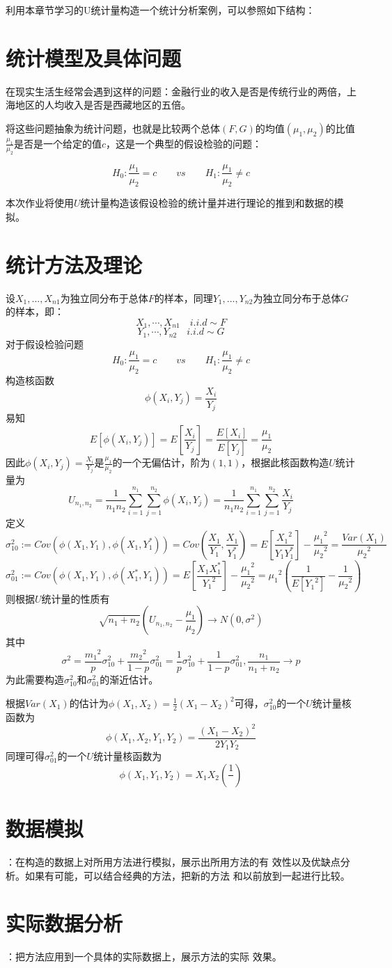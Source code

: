 \documentclass[UTF8]{article}
\begin{document}
	利用本章节学习的U统计量构造一个统计分析案例，可以参照如下结构：
	\section{统计模型及具体问题}
	在现实生活生经常会遇到这样的问题：金融行业的收入是否是传统行业的两倍，上海地区的人均收入是否是西藏地区的五倍。
	
	将这些问题抽象为统计问题，也就是比较两个总体$(F,G)$的均值$(\mu_1,\mu_2)$的比值$\frac{\mu_1}{\mu_2}$是否是一个给定的值$c$，这是一个典型的假设检验的问题：
	
	$$H_0:\frac{\mu_1}{\mu_2}=c \qquad vs\qquad H_1:\frac{\mu_1}{\mu_2}\neq c$$
	
	本次作业将使用$U$统计量构造该假设检验的统计量并进行理论的推到和数据的模拟。
	\section{统计方法及理论}
	设$X_1,...,X_{n1}$为独立同分布于总体$F$的样本，同理$Y_1,...,Y_{n2}$为独立同分布于总体$G$的样本，即：
	$$X_1,\cdots,X_{n1}\quad i.i.d \sim F$$
	$$Y_1,\cdots,Y_{n2}\quad i.i.d \sim G$$
	对于假设检验问题
	$$H_0:\frac{\mu_1}{\mu_2}=c \qquad vs\qquad H_1:\frac{\mu_1}{\mu_2}\neq c$$
	构造核函数
	$$\phi(X_i, Y_j)=\frac{X_i}{Y_j}$$
	易知
	$$E[\phi(X_i, Y_j)]=E[\frac{X_i}{Y_j}]=\frac{E[X_i]}{E[Y_j]}=\frac{\mu_1}{\mu_2}$$
	因此$\phi(X_i, Y_j)=\frac{X_i}{Y_j}$是$\frac{\mu_1}{\mu_2}$的一个无偏估计，阶为$(1, 1)$，根据此核函数构造$U$统计量为
		$$U_{n_1,n_2}=\frac{1}{n_1n_2}\sum_{i=1}^{n_1}\sum_{j=1}^{n_2}\phi(X_i, Y_j)=\frac{1}{n_1n_2}\sum_{i=1}^{n_1}\sum_{j=1}^{n_2}\frac{X_i}{Y_j}$$
	定义
	$$\sigma^2_{10} := Cov(\phi(X_1,Y_1),\phi(X_1,Y^*_1))=Cov(\frac{X_1}{Y_1},\frac{X_1}{Y^*_1})
	=E[\frac{{X_1}^2}{Y_1Y^*_1}]-\frac{{\mu_1}^2}{{\mu_2}^2}=\frac{Var(X_1)}{{\mu_2}^2}$$
	$$\sigma^2_{01} := Cov(\phi(X_1,Y_1),\phi(X^*_1,Y_1))=E[\frac{X_1X^*_1}{{Y_1}^2}]-\frac{{\mu_1}^2}{{\mu_2}^2}
	={\mu_1}^2(\frac1{E[{Y_1}^2]}-\frac1{{\mu_2}^2})$$
	则根据$U$统计量的性质有
	$$\sqrt{n_1+n_2}(U_{n_1,n_2}-\frac{\mu_1}{\mu_2})\rightarrow N(0,\sigma^2)$$
	其中
	$$\sigma^2=\frac{{m_1}^2}{p}\sigma^2_{10}+\frac{{m_2}^2}{1-p}\sigma^2_{01}
	=\frac1{p}\sigma^2_{10}+\frac1{1-p}\sigma^2_{01}, \frac{n_1}{n_1+n_2}\rightarrow p$$
	为此需要构造$\sigma^2_{10}$和$\sigma^2_{01}$的渐近估计。
	
	根据$Var(X_1)$的估计为$\phi(X_1, X_2)=\frac1{2}(X_1-X_2)^2$可得，$\sigma^2_{10}$的一个$U$统计量核函数为
	$$\phi(X_1, X_2,Y_1,Y_2) = \frac{(X_1-X_2)^2}{2Y_1Y_2}$$
	同理可得$\sigma^2_{01}$的一个$U$统计量核函数为
	$$\phi(X_1,Y_1,Y_2) = X_1X_2(\frac1{})$$
	\section{数据模拟}：在构造的数据上对所用方法进行模拟，展示出所用方法的有
	效性以及优缺点分析。如果有可能，可以结合经典的方法，把新的方法
	和以前放到一起进行比较。
	\section{实际数据分析}：把方法应用到一个具体的实际数据上，展示方法的实际
	效果。
\end{document}
